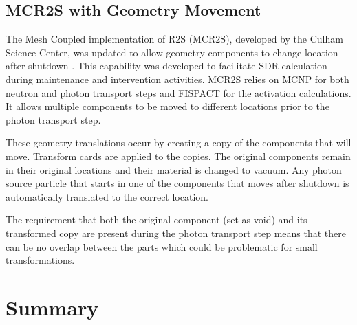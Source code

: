
\subsection{MCR2S with Geometry Movement}
The Mesh Coupled implementation of R2S (MCR2S), developed by the Culham Science Center, 
was updated to allow geometry components to change location after shutdown
\cite{mcr2s_move}.
This capability was developed to facilitate SDR calculation during maintenance and
intervention activities.  MCR2S relies on MCNP for both neutron and photon
transport steps and FISPACT for the activation calculations. 
It allows multiple components to be moved to
different locations prior to the photon transport step.

These geometry translations occur by creating a copy of the
components that will move.  Transform cards are applied to the copies. 
The original components remain in their original locations and their material
is changed to vacuum.  Any photon source particle that starts in one of the
components that moves after shutdown is automatically translated to the correct
location. %

The requirement that both the original component (set as void) and its
transformed copy are present during the photon transport step means that there
can be no overlap between the parts which could be problematic for small
transformations.

\section{Summary}

